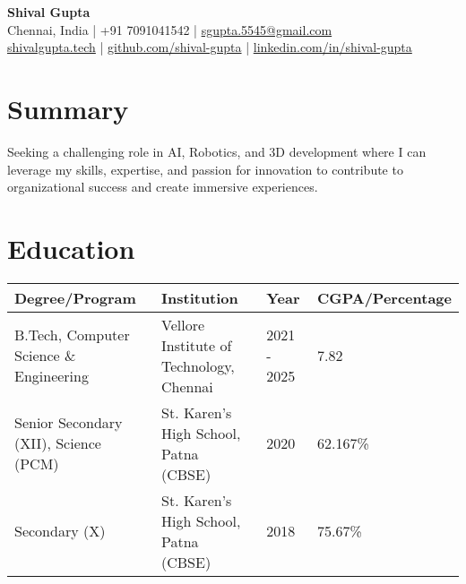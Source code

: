 \documentclass[a4paper,10pt]{article}
\newcommand{\sectionbreak}{\vspace{0cm}} %
\begin{document}
\begin{center}
    \centering
    {\fontsize{24pt}{28pt}\selectfont \textbf{Shival Gupta}} \\
    \vspace{0.2cm}
    \small Chennai, India | +91 7091041542 | \href{mailto:sgupta.5545@gmail.com}{\textcolor{accentcolor}{sgupta.5545@gmail.com}} \\
    \href{https://shivalgupta.tech/}{\textcolor{accentcolor}{shivalgupta.tech}} | \href{https://github.com/shival-gupta/}{\textcolor{accentcolor}{github.com/shival-gupta}} | \href{https://linkedin.com/in/shival-gupta/}{\textcolor{accentcolor}{linkedin.com/in/shival-gupta}}
\end{center}

\sectionbreak

\hrulefill

\sectionbreak

\section{Summary}
Seeking a challenging role in AI, Robotics, and 3D development where I can leverage my skills, expertise, and passion for innovation to contribute to organizational success and create immersive experiences.

\sectionbreak

\section{Education}

\begin{tabular}{|l|l|l|l|}
\hline
\textbf{Degree/Program} & \textbf{Institution} & \textbf{Year} & \textbf{CGPA/Percentage} \\ \hline
B.Tech, Computer Science \& Engineering & Vellore Institute of Technology, Chennai & 2021 - 2025 & 7.82 \\ \hline
Senior Secondary (XII), Science (PCM) & St. Karen's High School, Patna (CBSE) & 2020 & 62.167\% \\ \hline
Secondary (X) & St. Karen's High School, Patna (CBSE) & 2018 & 75.67\% \\ \hline
\end{tabular}

\sectionbreak

\end{document}
